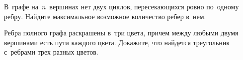 \begin{problems}
\item
В~графе на~$n$~вершинах нет двух циклов, пересекающихся ровно по~одному ребру.
Найдите максимальное возможное количество ребер в~нем.

\itemx{*}
Ребра полного графа раскрашены в~три цвета, причем между любыми двумя вершинами
есть пути каждого цвета.
Докажите, что найдется треугольник с~ребрами трех разных цветов.

\end{problems}

